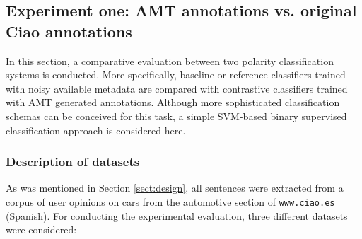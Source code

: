 \documentclass[11pt,letterpaper]{article}
\begin{document}
\subsection{Experiment one: AMT annotations vs. original Ciao annotations}
\label{eval1}

In this section, a comparative evaluation between two polarity classification systems is conducted. More specifically, baseline or reference classifiers trained with noisy available metadata are compared with contrastive classifiers trained with AMT generated annotations. Although more sophisticated classification schemas can be conceived for this task, a simple SVM-based binary supervised classification approach is considered here.

\subsubsection{Description of datasets}
\label{datasets}

As was mentioned in Section \ref{sect:design}, all sentences were extracted from a corpus of user opinions on cars from the automotive section of \texttt{www.ciao.es} (Spanish). For conducting the experimental evaluation, three different datasets were considered:
\end{document}

